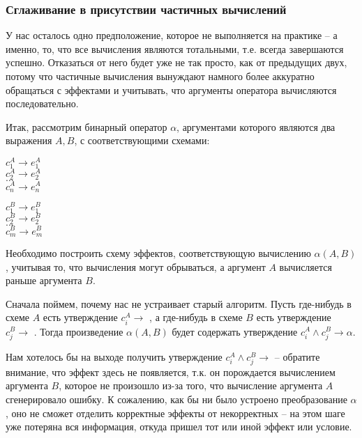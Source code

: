 \subsubsection{Сглаживание в присутствии частичных вычислений}

У нас осталось одно предположение, которое не выполняется на практике -- а именно, то, что все вычисления являются тотальными, т.е. всегда завершаются успешно. Отказаться от него будет уже не так просто, как от предыдущих двух, потому что частичные вычисления вынуждают намного более аккуратно обращаться с эффектами и учитывать, что аргументы оператора вычисляются последовательно. 

Итак, рассмотрим бинарный оператор $\alpha$, аргументами которого являются два выражения $A, B$, с соответствующими схемами:

{
	$c^A_1 \rightarrow e^A_1$ \\
	$c^A_2 \rightarrow e^A_2$ \\
	$\ldots$ \\
	$c^A_n \rightarrow e^A_n$ \\
}{}

\bigskip

{
	$c^B_1 \rightarrow e^B_1$ \\
	$c^B_2 \rightarrow e^B_2$ \\
	$\ldots$ \\
	$c^B_m \rightarrow e^B_m$ \\        
}{}

Необходимо построить схему эффектов, соответствующую вычислению $\alpha(A, B)$, учитывая то, что вычисления могут обрываться, а аргумент $A$ вычисляется раньше аргумента $B$.

Сначала поймем, почему нас не устраивает старый алгоритм. Пусть где-нибудь в схеме $A$ есть утверждение $c^A_i \rightarrow $ , а где-нибудь в схеме $B$ есть утверждение $c^B_j \rightarrow$ . Тогда произведение $\alpha(A, B)$ будет содержать утверждение $c^A_i \land c^B_j \rightarrow \alpha$. 

Нам хотелось бы на выходе получить утверждение $c^A_i \land c^B_j \rightarrow$  -- обратите внимание, что эффект  здесь не появляется, т.к. он порождается вычислением аргумента $B$, которое не произошло из-за того, что вычисление аргумента $A$ сгенерировало ошибку. К сожалению, как бы ни было устроено преобразование $\alpha$, оно не сможет отделить корректные эффекты от некорректных -- на этом шаге уже потеряна вся информация, откуда пришел тот или иной эффект или условие.

